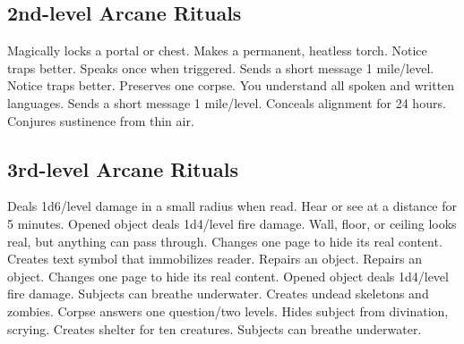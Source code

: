 \subsection{2nd-level Arcane Rituals}
\begin{rituallist}
   Magically locks a portal or chest.
   Makes a permanent, heatless torch.
   Notice traps better.
   Speaks once when triggered.
   Sends a short message 1 mile/level.
   Notice traps better.
   Preserves one corpse.
   You understand all spoken and written languages.
   Sends a short message 1 mile/level.
   Conceals alignment for 24 hours.
   Conjures sustinence from thin air.
\end{rituallist}

\subsection{3rd-level Arcane Rituals}
\begin{rituallist}
   Deals 1d6/level damage in a small radius when read.
   Hear or see at a distance for 5 minutes.
   Opened object deals 1d4/level fire damage.
   Wall, floor, or ceiling looks real, but anything can pass through.
   Changes one page to hide its real content.
   Creates text symbol that immobilizes reader.
   Repairs an object.
   Repairs an object.
   Changes one page to hide its real content.
   Opened object deals 1d4/level fire damage.
   Subjects can breathe underwater.
   Creates undead skeletons and zombies.
   Corpse answers one question/two levels.
   Hides subject from divination, scrying.
   Creates shelter for ten creatures.
   Subjects can breathe underwater.
\end{rituallist}

